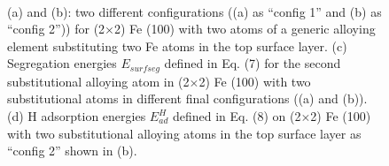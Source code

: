 \newpage
\begingroup
\begin{figure}[!ht]
  \centering
  \label{Chap:Mg_H:fig:11a}
  \label{Chap:Mg_H:fig:11b}
  \\
  \label{Chap:Mg_H:fig:11c}
  \label{Chap:Mg_H:fig:11d} 
\caption[Effects of 6 p-block elements on higher surface alloying coverage]{(a) and (b): two different configurations ((a) as ``config 1'' and (b) as ``config 2'')) for (2$\times$2) Fe (100) with two atoms of a generic alloying element substituting two Fe atoms in the top surface layer. (c) Segregation energies $E_{surf seg}$ defined in Eq. (7) for the second substitutional alloying atom in (2$\times$2) Fe (100) with two substitutional atoms in different final configurations ((a) and (b)). (d) H adsorption energies $E_{ad}^H$ defined in Eq. (8) on (2$\times$2) Fe (100) with two substitutional alloying atoms in the top surface layer as ``config 2'' shown in (b).}
  \label{Chap:Mg_H:fig11}
\end{figure}
\endgroup